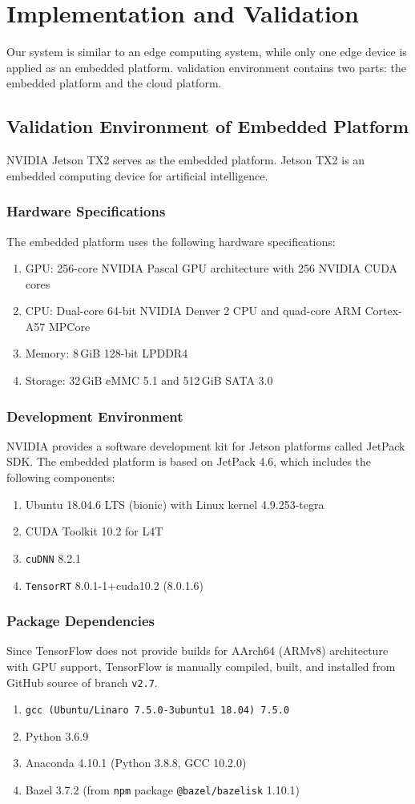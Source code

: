 \documentclass[a4paper]{article}
\begin{document}
\section{Implementation and Validation}
Our system is similar to an edge computing system, while only one edge device is applied as an embedded platform. validation environment contains two parts: the embedded platform and the cloud platform.
\subsection{Validation Environment of Embedded Platform}
NVIDIA Jetson TX2 serves as the embedded platform. Jetson TX2 is an embedded computing device for artificial intelligence.
\subsubsection{Hardware Specifications}
The embedded platform uses the following hardware specifications:
\begin{enumerate}
    \item GPU: 256-core NVIDIA Pascal GPU architecture with 256 NVIDIA CUDA cores
    \item CPU: Dual-core 64-bit NVIDIA Denver 2 CPU and quad-core ARM Cortex-A57 MPCore
    \item Memory: 8\,GiB 128-bit LPDDR4
    \item Storage: 32\,GiB eMMC 5.1 and 512\,GiB SATA 3.0
\end{enumerate}
\subsubsection{Development Environment}
NVIDIA provides a software development kit for Jetson platforms called JetPack SDK. The embedded platform is based on JetPack 4.6, which includes the following components:
\begin{enumerate}
    \item Ubuntu 18.04.6 LTS (bionic) with Linux kernel 4.9.253-tegra
    \item CUDA Toolkit 10.2 for L4T
    \item \texttt{cuDNN} 8.2.1
    \item \texttt{TensorRT} 8.0.1-1+cuda10.2 (8.0.1.6)
\end{enumerate}
\subsubsection{Package Dependencies}
Since TensorFlow does not provide builds for AArch64 (ARMv8) architecture with GPU support, TensorFlow is manually compiled, built, and installed from GitHub source of branch \texttt{v2.7}.
\begin{enumerate}
    \item \texttt{gcc (Ubuntu/Linaro 7.5.0-3ubuntu1~18.04) 7.5.0}
    \item Python 3.6.9
    \item Anaconda 4.10.1 (Python 3.8.8, GCC 10.2.0)
    \item Bazel 3.7.2 (from \texttt{npm} package \texttt{@bazel/bazelisk} 1.10.1)
\end{enumerate}
\end{document}
